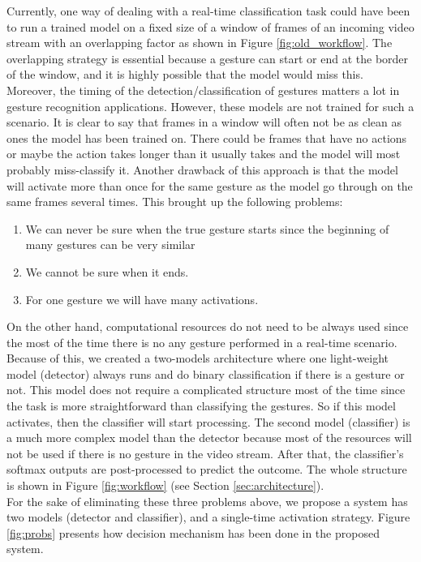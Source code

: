 Currently, one way of dealing with a real-time classification task could have been to run a trained model on a fixed size of a window of frames of an incoming video stream with an overlapping factor as shown in Figure \ref{fig:old_workflow}.  The overlapping strategy is essential because a gesture can start or end at the border of the window, and it is highly possible that the model would miss this.  Moreover, the timing of the detection/classification of gestures matters a lot in gesture recognition applications.   However, these models are not trained for such a scenario.  It is clear to say that frames in a window will often not be as clean as ones the model has been trained on. There could be frames that have no actions or maybe the action takes longer than it usually takes and the model will most probably miss-classify it.   Another drawback of this approach is that the model will activate more than once for the same gesture as the model go through on the same frames several times.  This brought up the following problems:
\begin{enumerate} 
\item We can never be sure when the true gesture starts since the beginning of many gestures can be very similar
\item We cannot be sure when it ends.
\item For one gesture we will have many activations.
\end{enumerate}
On the other hand,  computational resources do not need to be always used since the most of the time there is no any gesture performed in a real-time scenario.  Because of this,  we created a  two-models architecture where one light-weight model (detector) always runs and do binary classification if there is a gesture or not.   This model does not require a complicated structure most of the time since the task is more straightforward than classifying the gestures.   So if this model activates,  then the classifier will start processing. The second model (classifier) is a much more complex model than the detector because most of the resources will not be used if there is no gesture in the video stream.  After that, the classifier’s softmax outputs are post-processed to predict the outcome.  The whole structure is shown in Figure \ref{fig:workflow} (see Section \ref{sec:architecture}).\\

For the sake of eliminating these three problems above,  we propose a system has two models (detector and classifier), and a single-time activation strategy.   Figure  \ref{fig:probs} presents how decision mechanism has been done in the proposed system.\\

